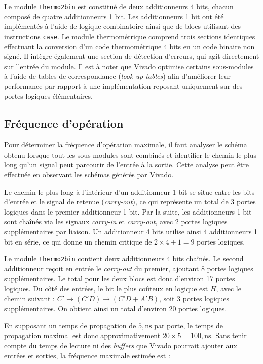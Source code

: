 \documentclass[a11paper]{article}
\begin{document}
Le module \texttt{thermo2bin} est constitué de deux additionneurs 4 bits,
chacun composé de quatre additionneurs 1 bit. Les additionneurs 1 bit ont été
implémentés à l’aide de logique combinatoire ainsi que de blocs utilisant des
instructions \texttt{case}. Le module thermométrique comprend trois sections
identiques effectuant la conversion d’un code thermométrique 4 bits en un
code binaire non signé. Il intègre également une section de détection
d’erreurs, qui agit directement sur l’entrée du module. Il est à noter que
Vivado optimise certains sous-modules à l’aide de tables de correspondance
(\textit{look-up tables}) afin d’améliorer leur performance par rapport à une
implémentation reposant uniquement sur des portes logiques élémentaires.

\subsection{Fréquence d’opération}

Pour déterminer la fréquence d’opération maximale, il faut analyser le schéma
obtenu lorsque tout les sous-modules sont combinés et identifier le chemin le
plus long qu’un signal peut parcourir de l’entrée à la sortie. Cette analyse
peut être effectuée en observant les schémas générés par Vivado.

Le chemin le plus long à l’intérieur d’un additionneur 1 bit se situe entre
les bits d’entrée et le signal de retenue (\textit{carry-out}), ce qui
représente un total de 3 portes logiques dans le premier additionneur 1 bit.
Par la suite, les additionneurs 1 bit sont chaînés via les signaux
\textit{carry-in} et \textit{carry-out}, avec 2 portes logiques
supplémentaires par liaison. Un additionneur 4 bits utilise ainsi 4
additionneurs 1 bit en série, ce qui donne un chemin critique de
$2 \times 4 + 1 = 9$ portes logiques.

Le module \texttt{thermo2bin} contient deux additionneurs 4 bits chaînés. Le
second additionneur reçoit en entrée le \textit{carry-out} du premier,
ajoutant 8 portes logiques supplémentaires. Le total pour les deux blocs est
donc d’environ 17 portes logiques. Du côté des entrées, le bit le plus
coûteux en logique est $H$, avec le chemin suivant : $C' \rightarrow (C'D)
	\rightarrow (C'D + A'B)$, soit 3 portes logiques supplémentaires. On obtient
ainsi un total d’environ 20 portes logiques.

En supposant un temps de propagation de $5,\text{ns}$ par porte, le temps de propagation maximal est donc approximativement $20 \times 5 = 100,\text{ns}$. Sans tenir compte du temps de lecture ni des \textit{buffers} que Vivado pourrait ajouter aux entrées et sorties, la fréquence maximale estimée est :
\end{document}
